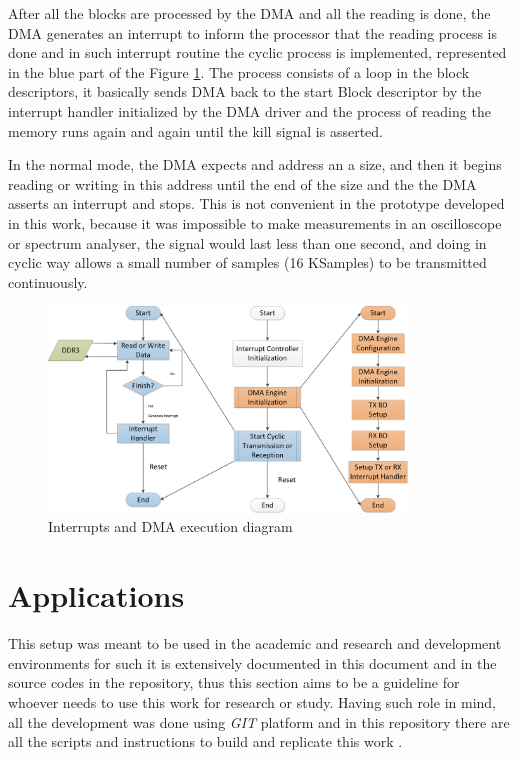 After all the blocks are processed by the DMA and all the reading is done, the
DMA generates an interrupt to inform the processor that the reading process is
done and in such interrupt routine the cyclic process is implemented,
represented in the blue part of the Figure \ref{fig:intcdmainit}. The process
consists of a loop in the block descriptors, it basically sends DMA back to the
start Block descriptor by the interrupt handler initialized by the DMA driver
and the process of reading the memory runs again and again until the kill signal
is asserted.

In the normal mode, the DMA expects and address an a size, and then it begins
reading or writing in this address until the end of the size and the the DMA
asserts an interrupt and stops. This is not convenient in the prototype
developed in this work, because it was impossible to make measurements in an
oscilloscope or spectrum analyser, the signal would last less than one second,
and doing in cyclic way allows a small number of samples (16 KSamples) to be
transmitted continuously.

\begin{figure}[htbp]
    \centering
    \includegraphics[width=0.85\textwidth]{./figures/dma_intc_driver}
    \caption{ Interrupts and DMA execution diagram
    \label{fig:intcdmainit}}
\end{figure}

\section{Applications}
%
This setup was meant to be used in the academic and research and development
environments for such it is extensively documented in this document and in the
source codes in the repository, thus this section aims to be a guideline for
whoever needs to use this work for research or study. Having such role in mind,
all the development was done using \emph{GIT} platform and in this repository
there are all the scripts and instructions to build and replicate this work
\cite{web:gitproject}.


